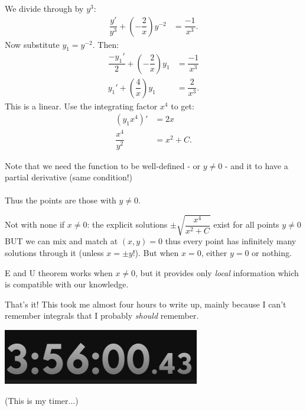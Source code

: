 \documentclass{article}
\begin{document}
    \begin{solution}[Solution 6a]
        We divide through by $y^3$:
        \begin{align}
            \dfrac{y'}{y^3} + \left(- \dfrac{2}{x}\right) y^{-2} &= \dfrac{-1}{x^3}. 
        \end{align}
        Now substitute $y_1 = y^{-2}$. Then:
        \begin{align}
            \dfrac{-y_1'}{2}+ \left(- \dfrac{2}{x}\right) y_1 &= \dfrac{-1}{x^3} \\ 
            y_1' + \left(\dfrac{4}{x}\right) y_1 &= \dfrac{2}{x^3}.
        \end{align}
        This is a linear. Use the integrating factor $x^4$ to get:
        \begin{align}
            (y_1 x^4)' &=2x \\ 
            \dfrac{x^4}{y^2} &= x^2 + C. 
        \end{align}
    \end{solution}
    \begin{solution}[Solution 6b]
        Note that we need the function to be well-defined - or $y \ne 0$ - and it to have a partial derivative (same condition!) \\~\\
        Thus the points are those with $y \ne 0$.
    \end{solution}
    \begin{solution}[Solution 6c]
        Not with none if $x \ne 0$: the explicit solutions $\pm \sqrt{\dfrac{x^4}{x^2 + C}}$ exist for all points $y\ne 0$ BUT we can mix and match at $(x,y) =0$ thus every 
        point has infinitely many solutions through it (unless $x = \pm y$!). But when $x =0$, either $y=0$ or nothing.
    \end{solution}
    \begin{solution}[Solution 6d]
        E and U theorem works when $x \ne 0$, but it provides only \textit{local} information which is compatible with our knowledge.
    \end{solution}
    That's it! This took me almost four hours to write up, mainly because I can't remember integrals that I probably \textit{should} remember. 
    \begin{center}
        \includegraphics{images/time.png}
    \end{center}
    (This is my timer...)
\end{document}
